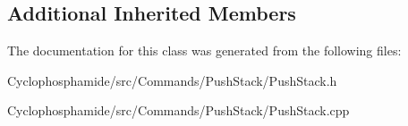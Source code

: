 \subsection*{Additional Inherited Members}


The documentation for this class was generated from the following files\+:\begin{DoxyCompactItemize}
\item 
Cyclophosphamide/src/\+Commands/\+Push\+Stack/Push\+Stack.\+h\item 
Cyclophosphamide/src/\+Commands/\+Push\+Stack/Push\+Stack.\+cpp\end{DoxyCompactItemize}
